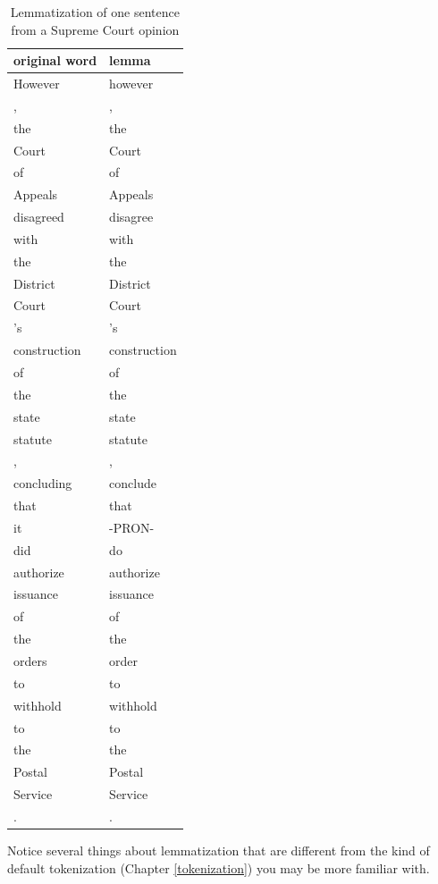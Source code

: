\documentclass[
]{krantz}
\begin{document}
\begin{table}

\caption{\label{tab:lemmatb}Lemmatization of one sentence from a Supreme Court opinion}
\centering
\begin{tabular}[t]{ll}
\toprule
original word & lemma\\
\midrule
However & however\\
, & ,\\
the & the\\
Court & Court\\
of & of\\
\addlinespace
Appeals & Appeals\\
disagreed & disagree\\
with & with\\
the & the\\
District & District\\
\addlinespace
Court & Court\\
's & 's\\
construction & construction\\
of & of\\
the & the\\
\addlinespace
state & state\\
statute & statute\\
, & ,\\
concluding & conclude\\
that & that\\
\addlinespace
it & -PRON-\\
did & do\\
authorize & authorize\\
issuance & issuance\\
of & of\\
\addlinespace
the & the\\
orders & order\\
to & to\\
withhold & withhold\\
to & to\\
\addlinespace
the & the\\
Postal & Postal\\
Service & Service\\
. & .\\
\bottomrule
\end{tabular}
\end{table}

Notice several things about lemmatization that are different from the kind of default tokenization (Chapter \ref{tokenization}) you may be more familiar with.
\end{document}
